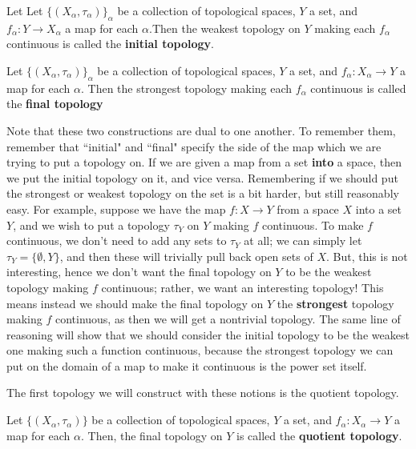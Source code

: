 	\begin{definition}
		Let Let $\{(X_\alpha, \tau_\alpha)\}_\alpha$ be a collection of topological spaces, $Y$ a set, and $f_\alpha : 
		Y\rightarrow X_\alpha$ a map for each $\alpha$.Then the weakest topology on $Y$ making each $f_\alpha$ 
		continuous is called the \textbf{initial topology}.
	\end{definition}
	
	\begin{definition}
		Let $\{(X_\alpha, \tau_\alpha)\}_\alpha$ be a collection of topological spaces, $Y$ a set, and $f_\alpha : 
		X_\alpha\rightarrow Y$ a map for each $\alpha$. Then the strongest topology making each $f_\alpha$ continuous is 
		called the \textbf{final topology}
	\end{definition}
	
	Note that these two constructions are dual to one another. To remember them, remember that ``initial" and ``final" specify 
	the side of the map which we are trying to put a topology on. If we are given a map from a set \textbf{into} a space, then 
	we put the initial topology on it, and vice versa. Remembering if we should put the strongest or weakest topology on the 
	set is a bit harder, but still reasonably easy. For example, suppose we have the map $f : X\rightarrow Y$ from a space $X$ 
	into a set $Y$, and we wish to put a topology $\tau_Y$ on $Y$ making $f$ continuous. To make $f$ continuous, we don't 
	need to add any sets to $\tau_Y$ at all; we can simply let $\tau_Y = \{\emptyset, Y\}$, and then these will trivially pull back 
	open sets of $X$. But, this is not interesting, hence we don't want the final topology on $Y$ to be the weakest topology 
	making $f$ continuous; rather, we want an interesting topology! This means instead we should make the final topology on 
	$Y$ the \textbf{strongest} topology making $f$ continuous, as then we will get a nontrivial topology. The same line of 
	reasoning will show that we should consider the initial topology to be the weakest one making such a function continuous, 
	because the strongest topology we can put on the domain of a map to make it continuous is the power set itself.
	
	The first topology we will construct with these notions is the quotient topology.
	
	\begin{definition}
		Let $\{(X_\alpha, \tau_\alpha)\}$ be a collection of topological spaces, $Y$ a set, and $f_\alpha : X_\alpha\rightarrow 
		Y$ a map for each $\alpha$. Then, the final topology on $Y$ is called the \textbf{quotient topology}. 
	\end{definition}
	
